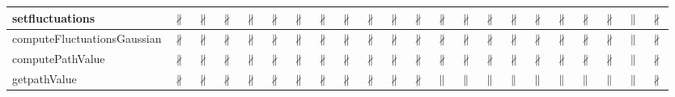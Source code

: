\documentclass[10pt]{article}
\begin{document}
\begin{longtable}{|l|l|l|l|l|l|l|l|l|l|l|l|l|l|l|l|l|l|l|l|l|l|}
\hline
setfluctuations&{\color{BrickRed}$\nparallel$}&{\color{BrickRed}$\nparallel$}&{\color{BrickRed}$\nparallel$}&{\color{BrickRed}$\nparallel$}&{\color{BrickRed}$\nparallel$}&{\color{BrickRed}$\nparallel$}&{\color{BrickRed}$\nparallel$}&{\color{BrickRed}$\nparallel$}&{\color{BrickRed}$\nparallel$}&{\color{BrickRed}$\nparallel$}&{\color{BrickRed}$\nparallel$}&{\color{BrickRed}$\nparallel$}&{\color{BrickRed}$\nparallel$}&{\color{BrickRed}$\nparallel$}&{\color{BrickRed}$\nparallel$}&{\color{BrickRed}$\nparallel$}&{\color{BrickRed}$\nparallel$}&{\color{BrickRed}$\nparallel$}&{\color{BrickRed}$\nparallel$}&{\color{blue}$\parallel$}&{\color{BrickRed}$\nparallel$}\\
\hline
computeFluctuationsGaussian&{\color{BrickRed}$\nparallel$}&{\color{BrickRed}$\nparallel$}&{\color{BrickRed}$\nparallel$}&{\color{BrickRed}$\nparallel$}&{\color{BrickRed}$\nparallel$}&{\color{BrickRed}$\nparallel$}&{\color{BrickRed}$\nparallel$}&{\color{BrickRed}$\nparallel$}&{\color{BrickRed}$\nparallel$}&{\color{BrickRed}$\nparallel$}&{\color{BrickRed}$\nparallel$}&{\color{BrickRed}$\nparallel$}&{\color{BrickRed}$\nparallel$}&{\color{BrickRed}$\nparallel$}&{\color{BrickRed}$\nparallel$}&{\color{BrickRed}$\nparallel$}&{\color{BrickRed}$\nparallel$}&{\color{BrickRed}$\nparallel$}&{\color{BrickRed}$\nparallel$}&{\color{blue}$\parallel$}&{\color{BrickRed}$\nparallel$}\\
\hline
computePathValue&{\color{BrickRed}$\nparallel$}&{\color{BrickRed}$\nparallel$}&{\color{BrickRed}$\nparallel$}&{\color{BrickRed}$\nparallel$}&{\color{BrickRed}$\nparallel$}&{\color{BrickRed}$\nparallel$}&{\color{BrickRed}$\nparallel$}&{\color{BrickRed}$\nparallel$}&{\color{BrickRed}$\nparallel$}&{\color{BrickRed}$\nparallel$}&{\color{BrickRed}$\nparallel$}&{\color{BrickRed}$\nparallel$}&{\color{BrickRed}$\nparallel$}&{\color{BrickRed}$\nparallel$}&{\color{BrickRed}$\nparallel$}&{\color{BrickRed}$\nparallel$}&{\color{BrickRed}$\nparallel$}&{\color{BrickRed}$\nparallel$}&{\color{BrickRed}$\nparallel$}&{\color{blue}$\parallel$}&{\color{BrickRed}$\nparallel$}\\
\hline
getpathValue&{\color{BrickRed}$\nparallel$}&{\color{BrickRed}$\nparallel$}&{\color{BrickRed}$\nparallel$}&{\color{BrickRed}$\nparallel$}&{\color{BrickRed}$\nparallel$}&{\color{BrickRed}$\nparallel$}&{\color{BrickRed}$\nparallel$}&{\color{BrickRed}$\nparallel$}&{\color{BrickRed}$\nparallel$}&{\color{BrickRed}$\nparallel$}&{\color{BrickRed}$\nparallel$}&{\color{blue}$\parallel$}&{\color{blue}$\parallel$}&{\color{blue}$\parallel$}&{\color{blue}$\parallel$}&{\color{blue}$\parallel$}&{\color{blue}$\parallel$}&{\color{blue}$\parallel$}&{\color{blue}$\parallel$}&{\color{blue}$\parallel$}&{\color{BrickRed}$\nparallel$}\\

\end{longtable}
\end{document}
